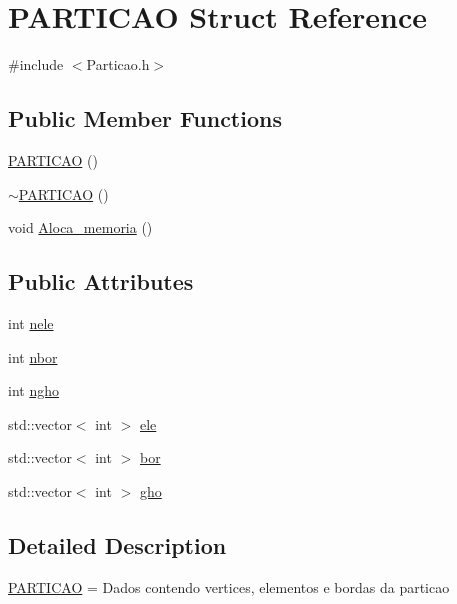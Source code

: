 \hypertarget{structPARTICAO}{}\section{P\+A\+R\+T\+I\+C\+AO Struct Reference}
\label{structPARTICAO}


{\ttfamily \#include $<$Particao.\+h$>$}

\subsection*{Public Member Functions}
\begin{DoxyCompactItemize}
\item 
\hyperlink{structPARTICAO_a81e58f447b3c4971d69d2b2f72883241}{P\+A\+R\+T\+I\+C\+AO} ()
\item 
\hyperlink{structPARTICAO_a66ddff2bfc683b115de034fd56fd1457}{$\sim$\+P\+A\+R\+T\+I\+C\+AO} ()
\item 
void \hyperlink{structPARTICAO_aef22e80bae9b273f319d73b39931c713}{Aloca\+\_\+memoria} ()
\end{DoxyCompactItemize}
\subsection*{Public Attributes}
\begin{DoxyCompactItemize}
\item 
int \hyperlink{structPARTICAO_a8465cb3d4cbe1aec08d4ed2901d7e9c3}{nele}
\item 
int \hyperlink{structPARTICAO_a8e5312eb634675d39d52fd2f999b66c4}{nbor}
\item 
int \hyperlink{structPARTICAO_a99fe0b2dd7b5315525d69831a5ef36c2}{ngho}
\item 
std\+::vector$<$ int $>$ \hyperlink{structPARTICAO_a1fac22569e19bcd3263740493f6ade13}{ele}
\item 
std\+::vector$<$ int $>$ \hyperlink{structPARTICAO_ac37aba358c6ada60310d8ebc054ffb5c}{bor}
\item 
std\+::vector$<$ int $>$ \hyperlink{structPARTICAO_ac90e9e5bcdfe5645bfa5ae8bb165669c}{gho}
\end{DoxyCompactItemize}


\subsection{Detailed Description}
\hyperlink{structPARTICAO}{P\+A\+R\+T\+I\+C\+AO} = Dados contendo vertices, elementos e bordas da particao


